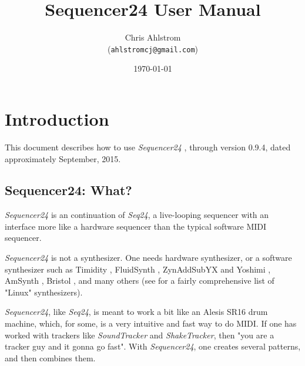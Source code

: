 \documentclass[
 11pt,
 twoside,
 a4paper,
 headinclude,
 footinclude,
 final                                 %
]{article}
\begin{document}
\title{Sequencer24 User Manual}
\author{Chris Ahlstrom \\
   (\texttt{ahlstromcj@gmail.com})}
\date{\today}
\maketitle
\tableofcontents
\listoffigures                         %
\listoftables                          %


\setlength{\parindent}{0pt}
\setlength{\parskip}{1ex plus 0.5ex minus 0.2ex}

\section{Introduction}
\label{sec:introduction}

   This document describes how to use \textsl{Sequencer24}
   \cite{seq24},
   through version 0.9.4, dated approximately September, 2015.

\subsection{Sequencer24: What?}
\label{subsec:what_is_seqeuncer24}

   \textsl{Sequencer24} is an continuation of \textsl{Seq24},
   a live-looping sequencer with an interface more like a hardware sequencer
   than the typical software MIDI sequencer.

   \textsl{Sequencer24} is not a synthesizer.  One needs hardware
   synthesizer, or a software synthesizer such as Timidity \cite{timidity},
   FluidSynth \cite{fluidsynth}, ZynAddSubYX \cite{zynaddsubfx} and Yoshimi
   \cite{yoshimi} \cite{yoshimi2}, AmSynth \cite{amsynth}, Bristol
   \cite{bristol}, and many others (see \cite{linuxsynths} for a fairly
   comprehensive list of "Linux" synthesizers).

   \textsl{Sequencer24}, like \textsl{Seq24},
   is meant to work a bit like an Alesis SR16 drum machine,
   which, for some, is a very intuitive and fast way to do MIDI.
   If one has worked with trackers like \textsl{SoundTracker} and
   \textsl{ShakeTracker}, then "you are a tracker guy and it gonna go fast".
   With \textsl{Sequencer24}, one creates several patterns, and then
   combines them.
\end{document}
